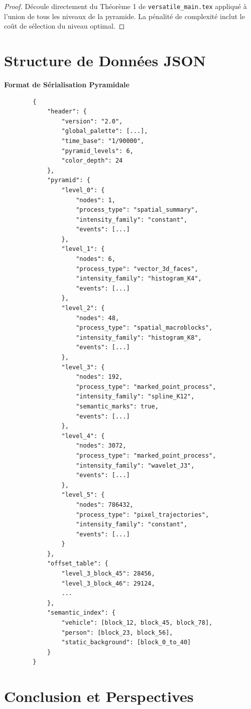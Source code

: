 \documentclass[12pt,a4paper]{article}
\theoremstyle{definition}
\begin{document}
	\begin{proof}
		Découle directement du Théorème 1 de \texttt{versatile\_main.tex} appliqué à l'union de tous les niveaux de la pyramide. La pénalité de complexité inclut le coût de sélection du niveau optimal.
	\end{proof}
	
	\section{Structure de Données JSON}
	
	\begin{techbox}
		\textbf{Format de Sérialisation Pyramidale}
	\end{techbox}
	
	\begin{verbatim}
		{
			"header": {
				"version": "2.0",
				"global_palette": [...],
				"time_base": "1/90000",
				"pyramid_levels": 6,
				"color_depth": 24
			},
			"pyramid": {
				"level_0": {
					"nodes": 1,
					"process_type": "spatial_summary",
					"intensity_family": "constant",
					"events": [...]
				},
				"level_1": {
					"nodes": 6,
					"process_type": "vector_3d_faces",
					"intensity_family": "histogram_K4",
					"events": [...]
				},
				"level_2": {
					"nodes": 48,
					"process_type": "spatial_macroblocks",
					"intensity_family": "histogram_K8",
					"events": [...]
				},
				"level_3": {
					"nodes": 192,
					"process_type": "marked_point_process",
					"intensity_family": "spline_K12",
					"semantic_marks": true,
					"events": [...]
				},
				"level_4": {
					"nodes": 3072,
					"process_type": "marked_point_process",
					"intensity_family": "wavelet_J3",
					"events": [...]
				},
				"level_5": {
					"nodes": 786432,
					"process_type": "pixel_trajectories",
					"intensity_family": "constant",
					"events": [...]
				}
			},
			"offset_table": {
				"level_3_block_45": 28456,
				"level_3_block_46": 29124,
				...
			},
			"semantic_index": {
				"vehicle": [block_12, block_45, block_78],
				"person": [block_23, block_56],
				"static_background": [block_0_to_40]
			}
		}
	\end{verbatim}
	
	\section{Conclusion et Perspectives}
	
\end{document}
